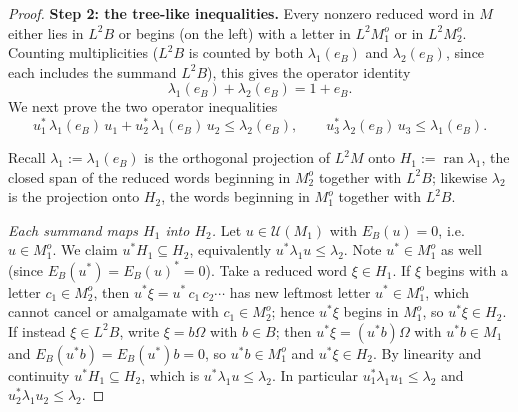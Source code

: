 \documentclass[a4paper, 11pt, reqno]{amsart}
\numberwithin{equation}{section}
\theoremstyle{plain}
\theoremstyle{remark}
\theoremstyle{definition}
\begin{document}
\begin{proof}
\medskip\noindent\textbf{Step 2: the tree-like inequalities.}
Every nonzero reduced word in $M$ either lies in $L^2B$ or begins (on the left) with a letter in $L^2M_1^o$ or in $L^2M_2^o$. Counting multiplicities ($L^2B$ is counted by both $\lambda_1(e_B)$ and $\lambda_2(e_B)$, since each includes the summand $L^2B$), this gives the operator identity
\begin{equation}\label{eq:lam-sum}
\lambda_1(e_B)+\lambda_2(e_B)=1+e_B .
\end{equation}
We next prove the two operator inequalities
\begin{equation}\label{eq:tree}
u_1^*\,\lambda_1(e_B)\,u_1+u_2^*\,\lambda_1(e_B)\,u_2\le\lambda_2(e_B),\qquad
u_3^*\,\lambda_2(e_B)\,u_3\le\lambda_1(e_B).
\end{equation}

Recall $\lambda_1:=\lambda_1(e_B)$ is the orthogonal projection of $L^2M$ onto $H_1:=\operatorname{ran}\lambda_1$, the closed span of the reduced words beginning in $M_2^o$ together with $L^2B$; likewise $\lambda_2$ is the projection onto $H_2$, the words beginning in $M_1^o$ together with $L^2B$.

\emph{Each summand maps $H_1$ into $H_2$.} Let $u\in\mathcal U(M_1)$ with $E_B(u)=0$, i.e.\ $u\in M_1^o$. We claim $u^*H_1\subseteq H_2$, equivalently $u^*\lambda_1 u\le\lambda_2$. Note $u^*\in M_1^o$ as well (since $E_B(u^*)=E_B(u)^*=0$). Take a reduced word $\xi\in H_1$. If $\xi$ begins with a letter $c_1\in M_2^o$, then $u^*\xi=u^*\,c_1\,c_2\cdots$ has new leftmost letter $u^*\in M_1^o$, which cannot cancel or amalgamate with $c_1\in M_2^o$; hence $u^*\xi$ begins in $M_1^o$, so $u^*\xi\in H_2$. If instead $\xi\in L^2B$, write $\xi=b\Omega$ with $b\in B$; then $u^*\xi=(u^*b)\Omega$ with $u^*b\in M_1$ and $E_B(u^*b)=E_B(u^*)b=0$, so $u^*b\in M_1^o$ and $u^*\xi\in H_2$. By linearity and continuity $u^*H_1\subseteq H_2$, which is $u^*\lambda_1 u\le\lambda_2$. In particular $u_1^*\lambda_1 u_1\le\lambda_2$ and $u_2^*\lambda_1 u_2\le\lambda_2$.


\end{proof}
\end{document}
